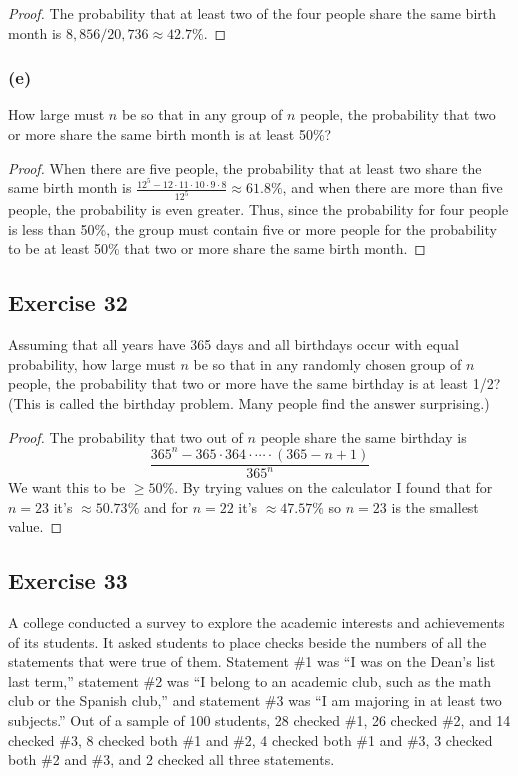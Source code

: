 \documentclass[14pt]{extarticle}
\begin{document}
\begin{proof}
     The probability that at least two of the four people share the same birth month is \(8,856 / 20,736 \approx 42.7\%\).
\end{proof}

\subsubsection{(e)}
How large must $n$ be so that in any group of $n$ people, the probability that two or more share the same birth month
is at least 50\%?

\begin{proof}
     When there are five people, the probability that at least two share the same birth month is \(\frac{12^5 - 12 \cdot
          11 \cdot 10 \cdot 9 \cdot 8}{12^5} \approx 61.8\%\), and when there are more than five people, the probability is
     even greater. Thus, since the probability for four people is less than 50\%, the group must contain five or more
     people for the probability to be at least 50\% that two or more share the same birth month.
\end{proof}

\subsection{Exercise 32}
Assuming that all years have 365 days and all birthdays occur with equal probability, how large must $n$ be so that
in any randomly chosen group of $n$ people, the probability that two or more have the same birthday is at least 1/2?
(This is called the birthday problem. Many people find the answer surprising.)

\begin{proof}
     The probability that two out of $n$ people share the same birthday is
     \[
          \frac{365^n - 365 \cdot 364 \cdot \cdots \cdot (365-n+1)}{365^n}
     \]
     We want this to be \(\geq 50\%\). By trying values on the calculator I found that for $n=23$ it's \(\approx 50.73\%\)
     and for $n=22$ it's \(\approx 47.57\%\) so $n=23$ is the smallest value.
\end{proof}

\subsection{Exercise 33}
A college conducted a survey to explore the academic interests and achievements of its students. It asked
students to place checks beside the numbers of all the statements that were true of them. Statement \#1 was “I was
on the Dean’s list last term,” statement \#2 was “I belong to an academic club, such as the math club or the Spanish
club,” and statement \#3 was “I am majoring in at least two subjects.” Out of a sample of 100 students, 28 checked \#1,
26 checked \#2, and 14 checked \#3, 8 checked both \#1 and \#2, 4 checked both \#1 and \#3, 3 checked both \#2 and
\#3, and 2 checked all three statements.
\end{document}
